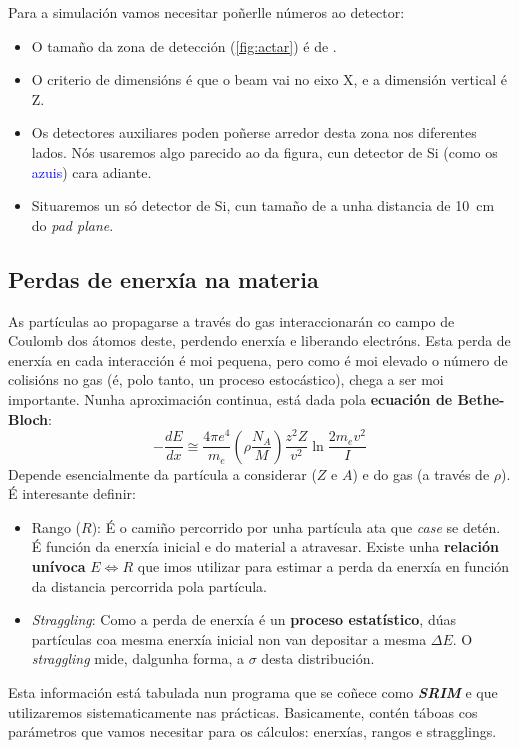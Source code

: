 \documentclass[11pt, a4paper]{article}
\begin{document}
Para a simulación vamos necesitar poñerlle números ao detector:
\begin{itemize}
    \item O tamaño da zona de detección (\autoref{fig:actar}) é de .
    \item O criterio de dimensións é que o beam vai no eixo X, e a dimensión vertical é Z.
    \item Os detectores auxiliares poden poñerse arredor desta zona nos diferentes lados. Nós usaremos algo parecido ao da figura, cun detector de Si (como os \textcolor{blue}{azuis}) cara adiante.
    \item Situaremos un só detector de Si, cun tamaño de  a unha distancia de \qty{10}{\cm} do \textit{pad plane}.
\end{itemize}

\subsection{Perdas de enerxía na materia}
As partículas ao propagarse a través do gas interaccionarán co campo de Coulomb dos átomos deste, perdendo enerxía e liberando electróns. Esta perda de enerxía en cada interacción é moi pequena, pero como é moi elevado o número de colisións no gas (é, polo tanto, un proceso estocástico), chega a ser moi importante. Nunha aproximación continua, está dada pola \textbf{ecuación de Bethe-Bloch}:
\begin{equation*}\label{eq:stopping}
    - \frac{dE}{dx} \cong \frac{4 \pi e^4}{m_e} \left(\rho \frac{N_A}{M}\right)\frac{z^2 Z}{v^2} \ln{\frac{2m_e v^2}{I}}
\end{equation*}
Depende esencialmente da partícula a considerar ($Z$ e $A$) e do gas (a través de $\rho$). É interesante definir:
\begin{itemize}
    \item Rango ($R$): É o camiño percorrido por unha partícula ata que \textit{case} se detén. É función da enerxía inicial e do material a atravesar. Existe unha \textbf{relación unívoca} $E \Longleftrightarrow R$ que imos utilizar para estimar a perda da enerxía en función da distancia percorrida pola partícula.
    \item \textit{Straggling}: Como a perda de enerxía é un \textbf{proceso estatístico}, dúas partículas coa mesma enerxía inicial non van depositar a mesma $\Delta E$. O \textit{straggling} mide, dalgunha forma, a $\sigma$ desta distribución.
\end{itemize}
Esta información está tabulada nun programa que se coñece como \textit{\textbf{SRIM}} e que utilizaremos sistematicamente nas prácticas. Basicamente, contén táboas cos parámetros que vamos necesitar para os cálculos: enerxías, rangos e stragglings.
\end{document}
